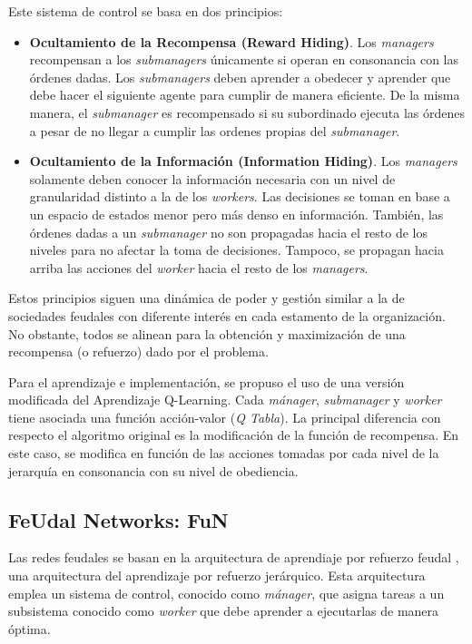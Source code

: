 \documentclass[letterpaper]{article} %
\begin{document}
Este sistema de control se basa en dos principios:
\begin{itemize}
    \item \textbf{Ocultamiento de la Recompensa (Reward Hiding)}. Los \textit{managers} recompensan a los \textit{submanagers} únicamente si operan 
    en consonancia con las órdenes dadas. Los \textit{submanagers} deben aprender a obedecer y aprender que debe hacer el siguiente agente para 
    cumplir de manera eficiente. De la misma manera, el \textit{submanager} es recompensado si su subordinado ejecuta las órdenes a pesar de no llegar a cumplir 
    las ordenes propias del \textit{submanager}.

    \item \textbf{Ocultamiento de la Información (Information Hiding)}. Los \textit{managers} solamente deben conocer la información necesaria 
    con un nivel de granularidad distinto a la de los \textit{workers}. Las decisiones se toman en base a un espacio de estados menor pero más
    denso en información. También, las órdenes dadas a un \textit{submanager} no son propagadas hacia el resto de los niveles para no afectar la toma
    de decisiones. Tampoco, se propagan hacia arriba las acciones del \textit{worker} hacia el resto de los \textit{managers}. 
\end{itemize}

Estos principios siguen una dinámica de poder y gestión similar a la de sociedades feudales con diferente interés en cada estamento de la organización.
No obstante, todos se alinean para la obtención y maximización de una recompensa (o refuerzo) dado por el problema.

Para el aprendizaje e implementación, se propuso el uso de una versión modificada del Aprendizaje Q-Learning. Cada \textit{mánager}, \textit{submanager} y
\textit{worker} tiene asociada una función acción-valor (\textit{Q Tabla}). La principal diferencia con respecto el algoritmo original es la 
modificación de la función de recompensa. En este caso, se modifica en función de las acciones tomadas por cada nivel de la jerarquía en consonancia 
con su nivel de obediencia. 

\subsection{FeUdal Networks: FuN}

Las redes feudales se basan en la arquitectura de aprendiaje por refuerzo feudal \cite{vezhnevets2017feudal}, 
una arquitectura del aprendizaje por refuerzo jerárquico. Esta arquitectura emplea un sistema de control, conocido
como \textit{mánager}, que asigna tareas a un subsistema conocido como \textit{worker} que debe aprender a ejecutarlas de manera óptima.
\end{document}
